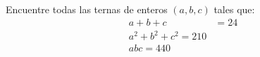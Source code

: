 Encuentre todas las ternas de enteros $ (a, b,c)$ tales que:
\begin{align*}
a+b+c&=24\\
a^2+b^2+c^2=210\\
abc=440
\end{align*}
